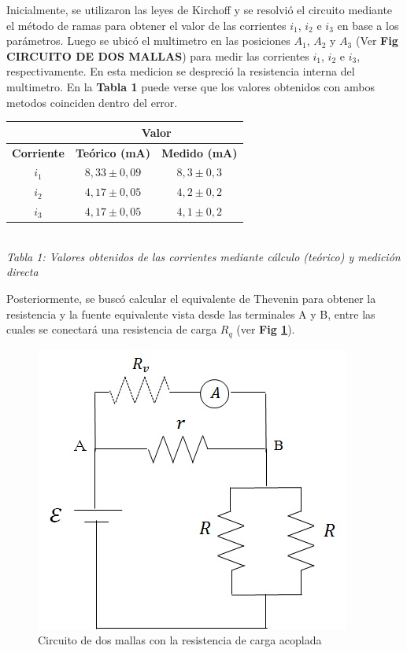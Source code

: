 \documentclass[11pt,a4paper]{article}
\begin{document}
 Inicialmente, se utilizaron las leyes de Kirchoff y se resolvió el circuito mediante el método de ramas para obtener el valor de las corrientes $i_1$, $i_2$ e $i_3$ en base a los parámetros. Luego se ubicó el multimetro en las posiciones $A_1$, $A_2$ y $A_3$ (Ver \textbf{Fig CIRCUITO DE DOS MALLAS})  para medir las corrientes $i_1$, $i_2$ e $i_3$, respectivamente. En esta medicion se despreció la resistencia interna del multimetro. En la \textbf{Tabla 1} puede verse que los valores obtenidos con ambos metodos coinciden dentro del error. 

\begin{center}
\begin{tabular}{||c|c|c||}
\hline
 & \multicolumn{2}{c||}{\textbf{Valor}} \\ \hline
\textbf{Corriente} & \textbf{Teórico (mA)} & \textbf{Medido (mA)} \\ \hline 
$i_1$ & $8,33\pm0,09$ & $8,3\pm0,3$ \\ \hline 
$i_2$ & $4,17\pm0,05$ & $4,2\pm0,2$ \\ \hline 
$i_3$ & $4,17\pm0,05$ & $4,1\pm0,2$ \\ \hline 
\end{tabular}\\

\textit{Tabla 1: Valores obtenidos de las corrientes mediante cálculo (teórico) y medición directa}
\end{center}

Posteriormente, se buscó calcular el equivalente de Thevenin para obtener la resistencia y la fuente equivalente vista desde las terminales A y B, entre las cuales se conectará una resistencia de carga $R_q$ (ver \textbf{Fig \ref{fig:circ_mallas_carga}}). 

\begin{figure}[h]
  \centering
  \includegraphics[scale=1]{Mallas_con_carga}
  \caption{Circuito de dos mallas con la resistencia de carga acoplada}
  \label{fig:circ_mallas_carga}
\end{figure}
\end{document}
